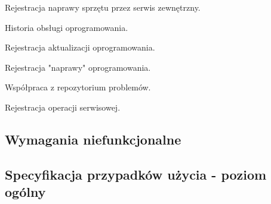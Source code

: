 \begin{myEnumerate}
\begin{myEnumerate}
\begin{myEnumerate}
			\item Rejestracja naprawy sprzętu przez serwis zewnętrzny.
			\end{myEnumerate}
		\item Historia obsługi oprogramowania.
		\begin{myEnumerate}
		\item Rejestracja aktualizacji oprogramowania.
		\item Rejestracja "naprawy" oprogramowania.
		\end{myEnumerate}
		\item Współpraca z repozytorium problemów.
		\begin{myEnumerate}
		\item Rejestracja operacji serwisowej.
		\end{myEnumerate}
	\end{myEnumerate}
\end{myEnumerate}
\subsection{Wymagania niefunkcjonalne}
\subsection{Specyfikacja przypadków użycia - poziom ogólny}
